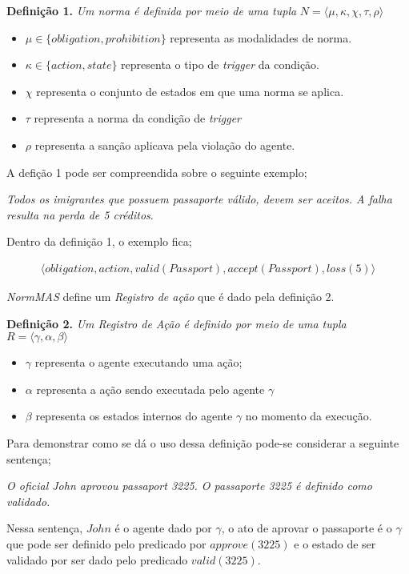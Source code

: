 \textbf{Definição 1.} \textit{Um norma é definida por meio de uma tupla} $N = \langle \mu,\kappa,\chi,\tau,\rho \rangle$

\begin{itemize}
    \item $\mu \in \{obligation,prohibition\}$ representa as modalidades de norma.
    \item $\kappa \in \{action,state\}$ representa o tipo de \textit{trigger} da condição.
    \item $\chi$ representa o conjunto de estados em que uma norma se aplica.
    \item $\tau$ representa a norma da condição de \textit{trigger}
    \item $\rho$ representa a sanção aplicava pela violação do agente.
\end{itemize}

A defição 1 pode ser compreendida sobre o seguinte exemplo; 

\textit{Todos os imigrantes que possuem passaporte válido, devem ser aceitos. A falha resulta na perda de 5 créditos}. 

Dentro da definição 1, o exemplo fica;

\begin{eqnarray}
    \langle obligation,action,valid(Passport),accept(Passport),loss(5)\rangle
\end{eqnarray}

\textit{NormMAS} define um \textit{Registro de ação} que é dado pela definição 2. 

\textbf{Definição 2.} \textit{Um Registro de Ação é definido por meio de uma tupla} $R = \langle \gamma,\alpha,\beta \rangle$

\begin{itemize}
    \item $\gamma$ representa o agente executando uma ação;
    \item $\alpha$ representa a ação sendo executada pelo agente $\gamma$
    \item $\beta$ representa os estados internos do agente $\gamma$ no momento da execução.
\end{itemize}

Para demonstrar como se dá o uso dessa definição pode-se considerar a seguinte sentença;

\textit{O oficial John aprovou passaport 3225. O passaporte 3225 é definido como validado.}

Nessa sentença, $John$ é o agente dado por $\gamma$, o ato de aprovar o passaporte é o $\gamma$ que pode ser definido pelo predicado por 
$approve(3225)$ e o estado de ser validado por ser dado pelo predicado $valid(3225)$.  


